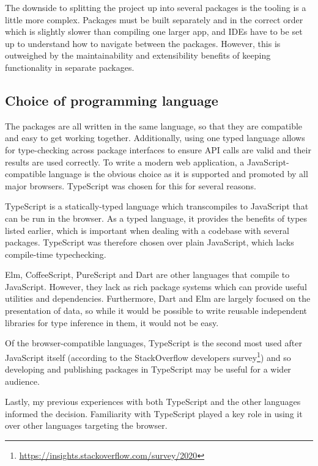 \documentclass[a4paper,fleqn,oneside,12pt]{report}
\begin{document}
The downside to splitting the project up into several packages is the tooling is a little more complex. Packages must be built separately and in the correct order which is slightly slower than compiling one larger app, and IDEs have to be set up to understand how to navigate between the packages. However, this is outweighed by the maintainability and extensibility benefits of keeping functionality in separate packages.

\subsection{Choice of programming language}\label{id:h.dj2rwwqr30vu}

The packages are all written in the same language, so that they are compatible and easy to get working together. Additionally, using one typed language allows for type-checking across package interfaces to ensure API calls are valid and their results are used correctly. To write a modern web application, a JavaScript-compatible language is the obvious choice as it is supported and promoted by all major browsers. TypeScript was chosen for this for several reasons.

TypeScript is a statically-typed language which transcompiles to JavaScript that can be run in the browser. As a typed language, it provides the benefits of types listed earlier, which is important when dealing with a codebase with several packages. TypeScript was therefore chosen over plain JavaScript, which lacks compile-time typechecking.

Elm, CoffeeScript, PureScript and Dart are other languages that compile to JavaScript. However, they lack as rich package systems which can provide useful utilities and dependencies. Furthermore, Dart and Elm are largely focused on the presentation of data, so while it would be possible to write reusable independent libraries for type inference in them, it would not be easy.

Of the browser-compatible languages, TypeScript is the second most used after JavaScript itself (according to the StackOverflow developers survey\footnote{\underline{\href{https://insights.stackoverflow.com/survey/2020\#technology-programming-scripting-and-markup-languages}{https://insights.stackoverflow.com/survey/2020}}}) and so developing and publishing packages in TypeScript may be useful for a wider audience.

Lastly, my previous experiences with both TypeScript and the other languages informed the decision. Familiarity with TypeScript played a key role in using it over other languages targeting the browser.
\end{document}
